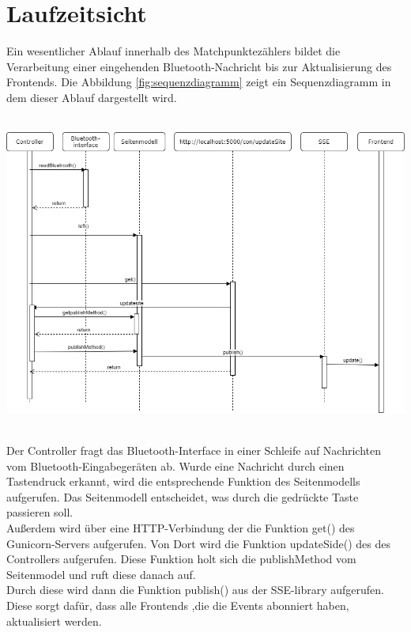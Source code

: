 \chapter{Laufzeitsicht}
Ein wesentlicher Ablauf innerhalb des Matchpunktezählers bildet die Verarbeitung einer eingehenden Bluetooth-Nachricht bis zur Aktualisierung des Frontends. Die Abbildung \ref{fig:sequenzdiagramm}  zeigt ein Sequenzdiagramm in dem dieser Ablauf dargestellt wird.  \\   \\
\begin{minipage}{\textwidth} 
	\centering
	\includegraphics[width=\textwidth]{Bilder/Sequenzdiagramm.png}\\
	\label{fig:sequenzdiagramm}
\end{minipage}
\\
Der Controller fragt das Bluetooth-Interface in einer Schleife auf Nachrichten vom Bluetooth-Eingabegeräten ab. Wurde eine Nachricht durch einen Tastendruck erkannt, wird die entsprechende Funktion des Seitenmodells aufgerufen. Das Seitenmodell entscheidet, was durch die gedrückte Taste passieren soll.\\   
Außerdem wird über eine HTTP-Verbindung der die Funktion get() des Gunicorn-Servers aufgerufen. Von Dort wird die Funktion updateSide() des des Controllers aufgerufen. Diese Funktion holt sich die publishMethod vom Seitenmodel und ruft diese danach auf.\\
Durch diese wird dann die Funktion publish() aus der SSE-library aufgerufen. Diese sorgt dafür, dass alle Frontends ,die die Events abonniert haben, aktualisiert werden.    